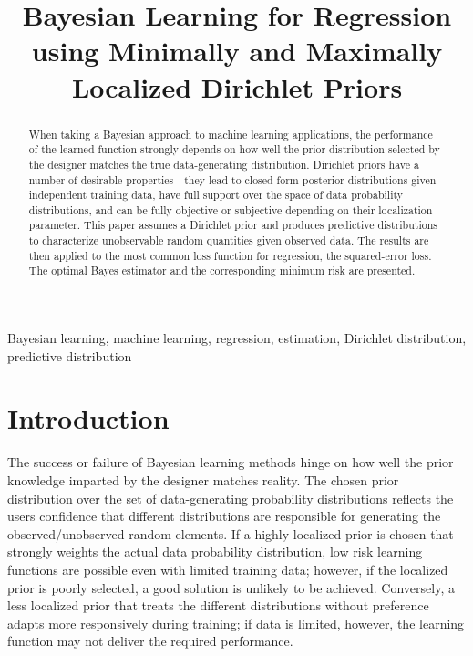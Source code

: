 \documentclass{article}
\title{Bayesian Learning for Regression using Minimally and Maximally Localized Dirichlet Priors}
\begin{document}
\maketitle


\begin{abstract}
When taking a Bayesian approach to machine learning applications, the performance of the learned function strongly depends on how well the prior distribution selected by the designer matches the true data-generating distribution. Dirichlet priors have a number of desirable properties - they lead to closed-form posterior distributions given independent training data, have full support over the space of data probability distributions, and can be fully objective or subjective depending on their localization parameter. This paper assumes a Dirichlet prior and produces predictive distributions to characterize unobservable random quantities given observed data. The results are then applied to the most common loss function for regression, the squared-error loss. The optimal Bayes estimator and the corresponding minimum risk are presented.
\end{abstract}

\begin{keywords}
Bayesian learning, machine learning, regression, estimation, Dirichlet distribution, predictive distribution
\end{keywords}



\section{Introduction}

The success or failure of Bayesian learning methods hinge on how well the prior knowledge imparted by the designer matches reality. The chosen prior distribution over the set of data-generating probability distributions reflects the users confidence that different distributions are responsible for generating the observed/unobserved random elements. If a highly localized prior is chosen that strongly weights the actual data probability distribution, low risk learning functions are possible even with limited training data; however, if the localized prior is poorly selected, a good solution is unlikely to be achieved. Conversely, a less localized prior that treats the different distributions without preference adapts more responsively during training; if data is limited, however, the learning function may not deliver the required performance.
\end{document}
